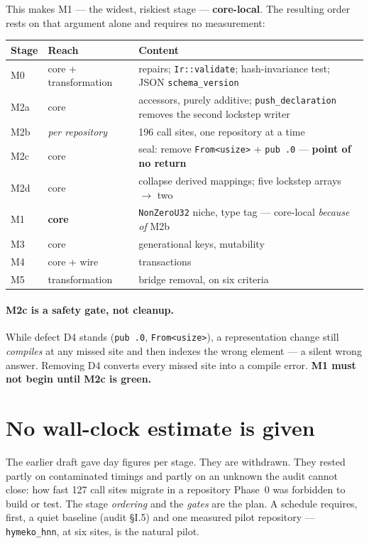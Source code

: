 \documentclass[11pt,a4paper]{article}
\newcommand{\code}[1]{\texttt{#1}}
\begin{document}
\medskip
\noindent
This makes M1 --- the widest, riskiest stage --- \textbf{core-local}. The
resulting order rests on that argument alone and requires no measurement:

\begin{center}
\begin{tabular}{@{}llp{5.6cm}@{}}
\toprule
\textbf{Stage} & \textbf{Reach} & \textbf{Content} \\
\midrule
M0  & core + transformation & repairs; \code{Ir::validate}; hash-invariance test; JSON \code{schema\_version} \\
M2a & core & accessors, purely additive; \code{push\_declaration} removes the second lockstep writer \\
M2b & \emph{per repository} & 196 call sites, one repository at a time \\
M2c & core & seal: remove \code{From<usize>} + \code{pub .0} --- \textbf{point of no return} \\
M2d & core & collapse derived mappings; five lockstep arrays $\to$ two \\
M1  & \textbf{core} & \code{NonZeroU32} niche, type tag --- core-local \emph{because of} M2b \\
M3  & core & generational keys, mutability \\
M4  & core + wire & transactions \\
M5  & transformation & bridge removal, on six criteria \\
\bottomrule
\end{tabular}
\end{center}

\paragraph{M2c is a safety gate, not cleanup.} While defect D4 stands
(\code{pub .0}, \code{From<usize>}), a representation change still
\emph{compiles} at any missed site and then indexes the wrong element --- a
silent wrong answer. Removing D4 converts every missed site into a compile
error. \textbf{M1 must not begin until M2c is green.}

\section{No wall-clock estimate is given}

The earlier draft gave day figures per stage. They are withdrawn. They rested
partly on contaminated timings and partly on an unknown the audit cannot close:
how fast 127 call sites migrate in a repository Phase~0 was forbidden to build
or test. The stage \emph{ordering} and the \emph{gates} are the plan. A schedule
requires, first, a quiet baseline (audit \S I.5) and one measured pilot
repository --- \code{hymeko\_hnn}, at six sites, is the natural pilot.
\end{document}
